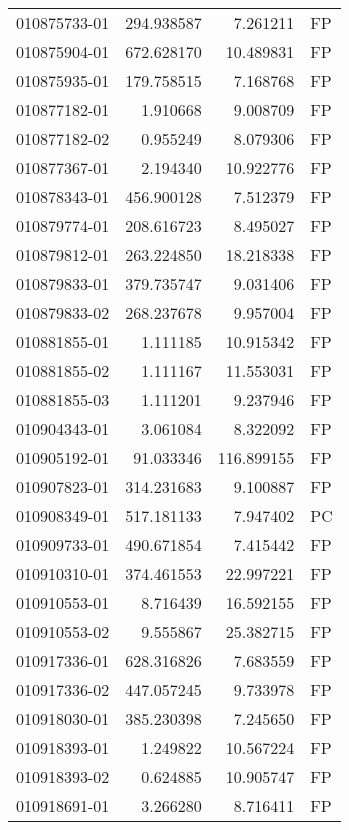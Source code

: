 \begin{tabular}{lrrl}
010875733-01 &  294.938587 &       7.261211 &   FP \\
010875904-01 &  672.628170 &      10.489831 &   FP \\
010875935-01 &  179.758515 &       7.168768 &   FP \\
010877182-01 &    1.910668 &       9.008709 &   FP \\
010877182-02 &    0.955249 &       8.079306 &   FP \\
010877367-01 &    2.194340 &      10.922776 &   FP \\
010878343-01 &  456.900128 &       7.512379 &   FP \\
010879774-01 &  208.616723 &       8.495027 &   FP \\
010879812-01 &  263.224850 &      18.218338 &   FP \\
010879833-01 &  379.735747 &       9.031406 &   FP \\
010879833-02 &  268.237678 &       9.957004 &   FP \\
010881855-01 &    1.111185 &      10.915342 &   FP \\
010881855-02 &    1.111167 &      11.553031 &   FP \\
010881855-03 &    1.111201 &       9.237946 &   FP \\
010904343-01 &    3.061084 &       8.322092 &   FP \\
010905192-01 &   91.033346 &     116.899155 &   FP \\
010907823-01 &  314.231683 &       9.100887 &   FP \\
010908349-01 &  517.181133 &       7.947402 &   PC \\
010909733-01 &  490.671854 &       7.415442 &   FP \\
010910310-01 &  374.461553 &      22.997221 &   FP \\
010910553-01 &    8.716439 &      16.592155 &   FP \\
010910553-02 &    9.555867 &      25.382715 &   FP \\
010917336-01 &  628.316826 &       7.683559 &   FP \\
010917336-02 &  447.057245 &       9.733978 &   FP \\
010918030-01 &  385.230398 &       7.245650 &   FP \\
010918393-01 &    1.249822 &      10.567224 &   FP \\
010918393-02 &    0.624885 &      10.905747 &   FP \\
010918691-01 &    3.266280 &       8.716411 &   FP \\

\end{tabular}
